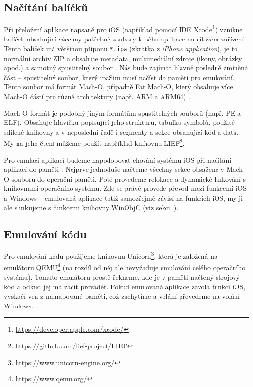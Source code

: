 \documentclass[12pt]{article}
\begin{document}
\subsection*{Načítání balíčků}

Při přeložení aplikace napsané pro iOS (například pomocí IDE Xcode\footnote{\url{https://developer.apple.com/xcode/}}) vznikne balíček obsahující všechny potřebné soubory k běhu aplikace na cílovém zařízení.
Tento balíček má většinou příponu \texttt{*.ipa} (zkratka z \textit{iPhone application}), je to normální archiv ZIP a obsahuje metadata, multimediální zdroje (ikony, obrázky apod.) a samotný spustitelný soubor \cite{ipa}.
Nás bude zajímat hlavně posledně zmíněná část -- spustitelný soubor, který ipaSim musí načíst do paměti pro emulování.
Tento soubor má formát Mach-O, případně Fat Mach-O, který obsahuje více Mach-O částí pro různé architektury (např. ARM a ARM64) \cite{macho}.

Mach-O formát je podobný jiným formátům spustitelných souborů (např. PE a ELF).
Obsahuje hlavičku popisující jeho strukturu, tabulku symbolů, použité sdílené knihovny a v neposlední řadě i segmenty a sekce obsahující kód a data.
My na jeho čtení můžeme použít například knihovnu LIEF\footnote{\url{https://github.com/lief-project/LIEF}}.

Pro emulaci aplikací budeme napodobovat chování systému iOS při načítání aplikací do paměti \cite{execMacho}.
Nejprve jednoduše načteme všechny sekce obsažené v Mach-O souboru do operační paměti.
Poté provedeme relokace a dynamické linkování s knihovnami operačního systému.
Zde se právě provede převod mezi funkcemi iOS a Windows -- emulovaná aplikace totiž samozřejmě závisí na funkcích iOS, my ji ale slinkujeme s funkcemi knihovny WinObjC (viz sekci~).

\subsection*{Emulování kódu}

Pro emulování kódu použijeme knihovnu Unicorn\footnote{\url{https://www.unicorn-engine.org/}}, která je založená na emulátoru QEMU\footnote{\url{https://www.qemu.org/}} (na rozdíl od něj ale nevyžaduje emulování celého operačního systému).
Tomuto emulátoru prostě řekneme, kde je v paměti načtený strojový kód a odkud jej má začít provádět.
Pokud emulovaná aplikace zavolá funkci iOS, vyskočí ven z namapované paměti, což zachytíme a volání převedeme na volání Windows.
\end{document}
